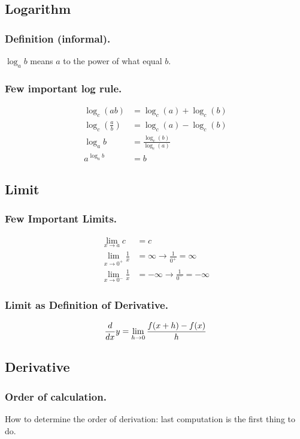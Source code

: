 \documentclass[../main.tex]{subfiles}
\begin{document}
\subsection*{Logarithm}
\subsubsection*{Definition (informal).} $\log_a b$ means $a$ to the power of what equal $b$.

\subsubsection*{Few important log rule.}
\begin{align*}
    \log_c (ab)&=\log_c (a)+\log_c (b)\\
    \log_c (\frac{a}{b})&=\log_c (a)-\log_c (b)\\
    \log_a b&=\frac{\log_c (b)}{\log_c (a)}\\
    a^{\log_a b}&=b
\end{align*}

\subsection*{Limit}
\subsubsection*{Few Important Limits.}
\begin{align*}
    \lim_{x\to a} c&=c\\
    \lim_{x\to 0^+} \frac{1}{x}&=\infty\rightarrow\frac{1}{0^+}=\infty\\
    \lim_{x\to 0^-} \frac{1}{x}&=-\infty\rightarrow\frac{1}{0^-}=-\infty
\end{align*}
\subsubsection*{Limit as Definition of Derivative.}
\begin{align*}
    \frac{d}{dx} y=\lim_{h\to 0}\frac{f(x+h)-f(x)}{h}
\end{align*}

\subsection*{Derivative}

\subsubsection*{Order of calculation.} How to determine the order of derivation: last computation is the first thing to do.
\end{document}
